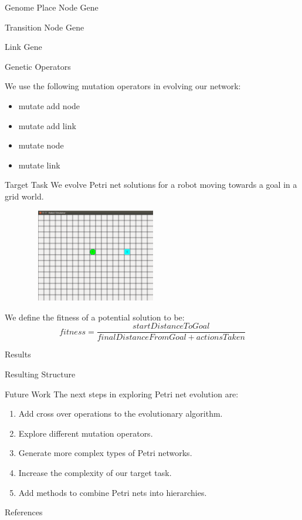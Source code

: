 \documentclass[12pt]{beamer}
\begin{document}
\begin{frame}{Genome}
Place Node Gene

Transition Node Gene

Link Gene

\end{frame}

\begin{frame}{Genetic Operators}

We use the following mutation operators in evolving our network:
\begin{itemize}
\item mutate add node
\item mutate add link
\item mutate node
\item mutate link
\end{itemize}

\end{frame}

\begin{frame}{Target Task}
We evolve Petri net solutions for a robot moving towards a goal in a grid world.
\begin{figure}
\includegraphics[trim = 80mm 80mm 20mm 70mm, clip, width = 2.4in, height = 1.6in]{robot_sim.png}
\end{figure}
We define the fitness of a potential solution to be:
$$fitness = \frac{startDistanceToGoal}{finalDistanceFromGoal + actionsTaken}$$
\end{frame}

\begin{frame}{Results}

\end{frame}

\begin{frame}{Resulting Structure}

\end{frame}

\begin{frame}{Future Work}
The next steps in exploring Petri net evolution are:
\begin{enumerate}
\item Add cross over operations to the evolutionary algorithm.
\item Explore different mutation operators.
\item Generate more complex types of Petri networks.
\item Increase the complexity of our target task.
\item Add methods to combine Petri nets into hierarchies.
\end{enumerate}

\end{frame}

\begin{frame}{References}

\end{frame}
\end{document}
